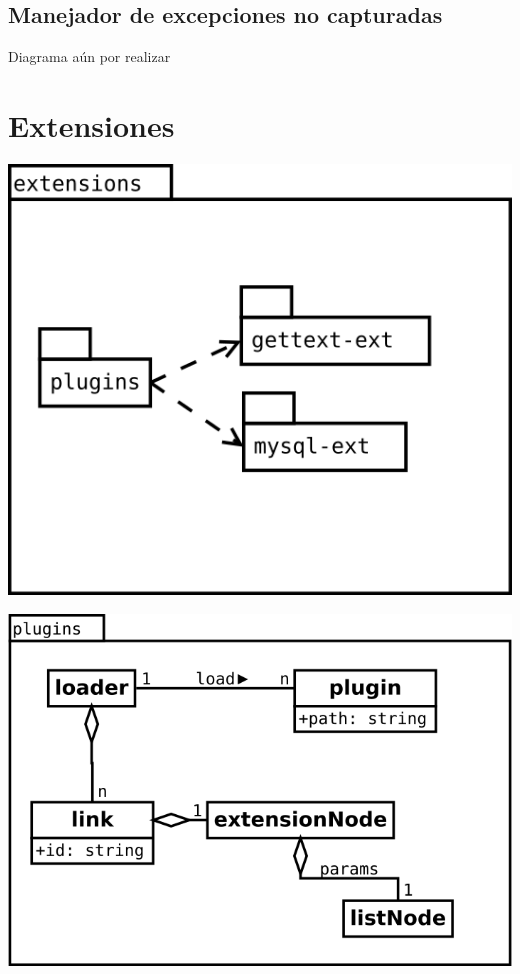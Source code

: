 \subsection {Manejador de excepciones no capturadas} 
Diagrama aún por realizar

\pagebreak
\section {Extensiones} 
\begin{center}
\includegraphics[scale=0.4]{extensions-package.png} \\
\end{center}

\begin{center}
\includegraphics[scale=0.4]{plugins.png} \\
\end{center}

